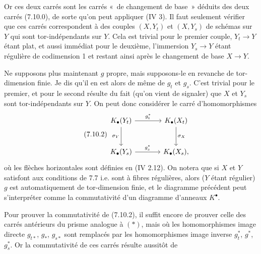 Or ces
deux carrés sont les carrés «~de changement de base~» déduits des deux carrés (7.10.0), de sorte qu'on peut appliquer (IV 3). Il faut seulement vérifier que ces carrés correspondent à des couples \((X,Y_t)\) et \((X,Y_s)\) de schémas sur \(Y\) qui sont tor-indépendants sur \(Y\). Cela est trivial pour le premier couple, \(Y_t\to Y\) étant plat, et aussi immédiat pour le deuxième, l'immersion \(Y_s\to Y\) étant régulière de codimension 1 et restant ainsi après le changement de base \(X\to Y\).

Ne supposons plus maintenant \(g\) propre, mais supposons-le en revanche de tor-dimension finie. Je dis qu'il en est alors de même de \(g_t\) et \(g_s\). C'est trivial pour le premier, et pour le second résulte du fait (qu'on vient de signaler) que \(X\) et \(Y_s\) sont tor-indépendants sur \(Y\). On peut donc considérer le carré d'homomorphismes
\begin{equation}\tag{7.10.2}
\begin{tikzcd}[column sep=large,row sep=large]
K_\bullet(Y_t) \arrow[r,"g_t^*"] \arrow[d,"\sigma_Y"'] &
K_\bullet(X_t) \arrow[d,"\sigma_X"]\\
K_\bullet(Y_s) \arrow[r,"g_s^*"] &
K_\bullet(X_s),
\end{tikzcd}
\end{equation}
où les flèches horizontales sont définies en (IV 2.12). On notera que si \(X\) et \(Y\) satisfont aux conditions de 7.7 i.e. sont à fibres régulières, alors (\(Y\) étant régulier) \(g\) est automatiquement de tor-dimension finie, et le diagramme précédent peut s'interpréter comme la commutativité d'un diagramme d'anneaux \(K^\bullet\).

Pour prouver la commutativité de (7.10.2), il suffit encore de prouver celle des carrés antérieurs du prisme analogue à \((*)\), mais où les homomorphismes image directe \(g_{t*}\), \(g_*\), \(g_{s*}\) sont remplacés par les homomorphismes image inverse \(g_t^*\), \(g^*\), \(g_s^*\). Or la commutativité de ces carrés résulte aussitôt de

